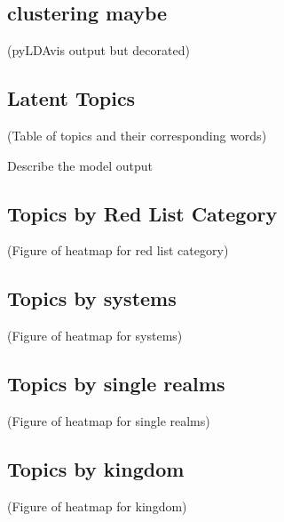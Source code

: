 \subsection{clustering maybe}

(pyLDAvis output but decorated)

\subsection{Latent Topics}

(Table of topics and their corresponding words)

Describe the model output

\subsection{Topics by Red List Category}

(Figure of heatmap for red list category)

\subsection{Topics by systems}

(Figure of heatmap for systems)

\subsection{Topics by single realms}

(Figure of heatmap for single realms)

\subsection{Topics by kingdom}

(Figure of heatmap for kingdom)

\subsection{}
